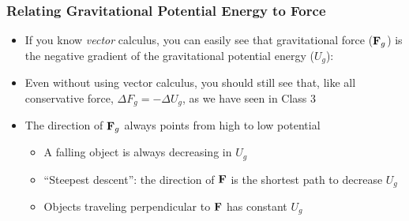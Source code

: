 \documentclass[12pt,compress,aspectratio=169]{beamer}
\newcommand{\mb}[1]{\ensuremath\mathbf{#1}}
\begin{document}
\begin{frame}
  \frametitle{Relating Gravitational Potential Energy to Force}%
  \begin{itemize}
  \item If you know \emph{vector} calculus, you can easily see that
    gravitational force ($\mb{F}_g$) is the negative gradient of the
    gravitational potential energy ($U_g$):

    \vspace{-0.1in}{\Large
      \begin{displaymath}
        \mb{F}_g=-\nabla U_g=
        -\frac{\partial U_g}{\partial r}\hat{\mb{r}}
      \end{displaymath}
    }
  \item Even without using vector calculus, you should still see that, like
    all conservative force, $\Delta F_g=-\Delta U_g$, as we have seen in Class
    3
  \item The direction of $\mb{F}_g$ always points from high to low potential
    \begin{itemize}
    \item A falling object is always decreasing in $U_g$
    \item ``Steepest descent'': the direction of $\mb{F}$ is the shortest path
      to decrease $U_g$ 
    \item Objects traveling perpendicular to $\mb{F}$ has constant $U_g$
    \end{itemize}
  \end{itemize}
\end{frame}
\end{document}
